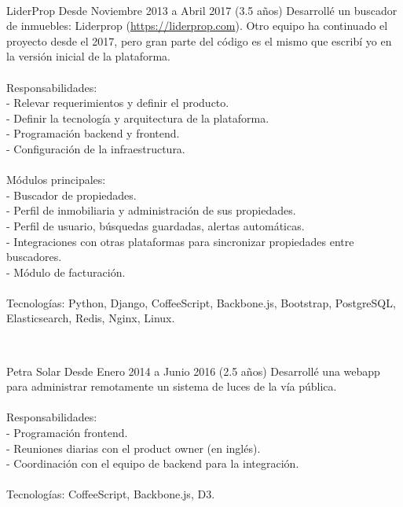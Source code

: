\begin{enumerate}[leftmargin=0.8cm]
{\begin{itemize}[leftmargin=0.2cm]
      ~

      {LiderProp}
      {Desde Noviembre 2013 a Abril 2017 (3.5 años)}
      {
        Desarrollé un buscador de inmuebles: Liderprop (\url{https://liderprop.com}).
        Otro equipo ha continuado el proyecto desde el 2017, pero gran parte del código es el mismo que escribí yo en la versión inicial de la plataforma.
        \\ \\ Responsabilidades:
        \\ - Relevar requerimientos y definir el producto.
        \\ - Definir la tecnología y arquitectura de la plataforma.
        \\ - Programación backend y frontend.
        \\ - Configuración de la infraestructura.
        \\ \\ Módulos principales:
        \\ - Buscador de propiedades.
        \\ - Perfil de inmobiliaria y administración de sus propiedades.
        \\ - Perfil de usuario, búsquedas guardadas, alertas automáticas.
        \\ - Integraciones con otras plataformas para sincronizar propiedades entre buscadores.
        \\ - Módulo de facturación.
        \\ \\ Tecnologías: Python, Django, CoffeeScript, Backbone.js, Bootstrap, PostgreSQL, Elasticsearch, Redis, Nginx, Linux.
      }

      ~

      {Petra Solar}
      {Desde Enero 2014 a Junio 2016 (2.5 años)}
      {
        Desarrollé una webapp para administrar remotamente un sistema de luces de la vía pública.
        \\ \\ Responsabilidades:
        \\ - Programación frontend.
        \\ - Reuniones diarias con el product owner (en inglés).
        \\ - Coordinación con el equipo de backend para la integración.
        \\ \\ Tecnologías: CoffeeScript, Backbone.js, D3.
      }


\end{itemize}}
\end{enumerate}
